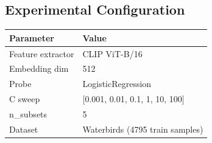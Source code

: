 \subsection{Experimental Configuration}

\begin{table}[h]
\centering
\begin{tabular}{@{}ll@{}}
\toprule
Parameter & Value \\
\midrule
Feature extractor & CLIP ViT-B/16 \\
Embedding dim & 512 \\
Probe & LogisticRegression \\
C sweep & [0.001, 0.01, 0.1, 1, 10, 100] \\
n\_subsets & 5 \\
Dataset & Waterbirds (4795 train samples) \\
\bottomrule
\end{tabular}
\end{table}
